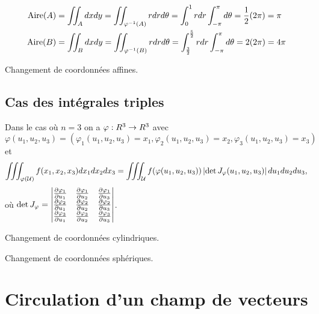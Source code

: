 \begin{exemple}
	\begin{align*}
		\operatorname{Aire}(A) &=  \iint_A  dxdy = \iint_{\varphi^{-1}(A)} r dr d\theta  = \int_0^1 rdr \int_{-\pi}^{\pi}d\theta = \frac 1 2 (2\pi)  = \pi\\
		\operatorname{Aire}(B) & =  \iint_B  dxdy = \iint_{\varphi^{-1}(B)} r dr d\theta  = \int_{\frac 3 2 }^{\frac 5 2} rdr \int_{-\pi}^{\pi}d\theta = 2 (2\pi) = 4\pi
	\end{align*}

\end{exemple}

\begin{exemple}
	Changement de coordonnées affines. 
\pl{\rep{16cm}}
\end{exemple}

\sld{\vfill\pagebreak[5]}%

\subsection{Cas des intégrales triples}

Dans le cas où $n=3$ on a $\varphi: R^3 \to R^3$ avec $ \varphi(u_1,u_2,u_3) = (\varphi_1(u_1,u_2,u_3 )= x_1,\varphi_2 (u_1,u_2,u_3 )= x_2, \varphi_3(u_1,u_2,u_3) = x_3)$  et 
\[
	\iiint_{\varphi(\mathcal{U})} f(x_1,x_2,x_3) dx_1dx_2dx_3  = \iiint_{ \mathcal{U} } f( \varphi(u_1,u_2,u_3)) \left\lvert\det J_\varphi(u_1,u_2,u_3)\right\rvert du_1du_2du_3,
\]
où $\det J_\varphi = \begin{vmatrix}
	\frac{\partial \varphi_1}{\partial u_1}& \frac{\partial \varphi_1}{\partial u_2} & \frac{\partial \varphi_1}{\partial u_3}  \\ \frac{\partial \varphi_2}{\partial u_1} & \frac{\partial \varphi_2}{\partial u_2} & \frac{\partial \varphi_2}{\partial u_3} \\
	\frac{\partial \varphi_3}{\partial u_1}& \frac{\partial \varphi_3}{\partial u_2} & \frac{\partial \varphi_3}{\partial u_3} 
\end{vmatrix}$.


\begin{exemple}
	Changement de coordonnées cylindriques.
\pl{\rep{12cm}}
\end{exemple}

\begin{exemple}
	Changement de coordonnées sphériques.
\pl{\rep{12cm}}
\end{exemple}


\sld{\vfill\pagebreak[5]}%


\section{Circulation d'un champ de vecteurs}

